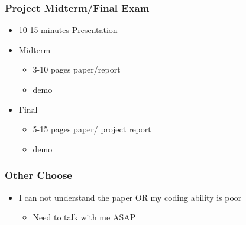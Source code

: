 \begin{frame}[plain]	
	\frametitle{Project Midterm/Final Exam}
	
	\begin{itemize}\Large
		\item 10-15 minutes Presentation
		\item Midterm
		\begin{itemize}\large
			\item 3-10 pages paper/report
			\item demo
			
		\end{itemize}
		\item Final
		\begin{itemize}\large
			\item 5-15 pages paper/ project report
			\item demo
			
		\end{itemize}	
	\end{itemize}
	
	
\end{frame}

\begin{frame}[plain]	
	\frametitle{Other Choose}
	
	\begin{itemize}\Large
		\item I can not understand the paper OR my coding
		ability is poor
		\begin{itemize}\large
			\item Need to talk with me ASAP
			
		\end{itemize}
	\end{itemize}
	
	
\end{frame}
